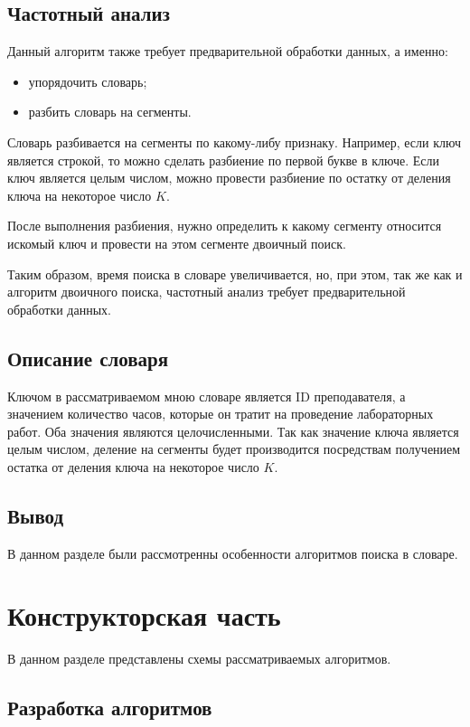 \documentclass[12pt]{report}
\begin{document}
	\section{Частотный анализ}
	
	Данный алгоритм также требует предварительной обработки данных, а именно:
	
	\begin{itemize}
		\item упорядочить словарь;
		\item разбить словарь на сегменты.
	\end{itemize}
	
	Словарь разбивается на сегменты по какому-либу признаку. Например, если ключ является строкой, то можно сделать разбиение по первой букве в ключе. Если ключ является целым числом, можно провести разбиение по остатку от деления ключа на некоторое число $K$.
	
	После выполнения разбиения, нужно определить к какому сегменту относится искомый ключ и провести на этом сегменте двоичный поиск.
	
	Таким образом, время поиска в словаре увеличивается, но, при этом, так же как и алгоритм двоичного поиска, частотный анализ требует предварительной обработки данных. 
	
	\section{Описание словаря}
	
	Ключом в рассматриваемом мною словаре является ID преподавателя, а значением количество часов, которые он тратит на проведение лабораторных работ. Оба значения являются целочисленными. Так как значение ключа является целым числом, деление на сегменты будет производится посредствам получением остатка от деления ключа на некоторое число $K$.
	
	\section*{Вывод}
	В данном разделе были рассмотренны особенности алгоритмов поиска в словаре.
	
	\chapter{Конструкторская часть}
	
	В данном разделе представлены схемы рассматриваемых алгоритмов.
	
	\section{Разработка алгоритмов}
	
\end{document}
